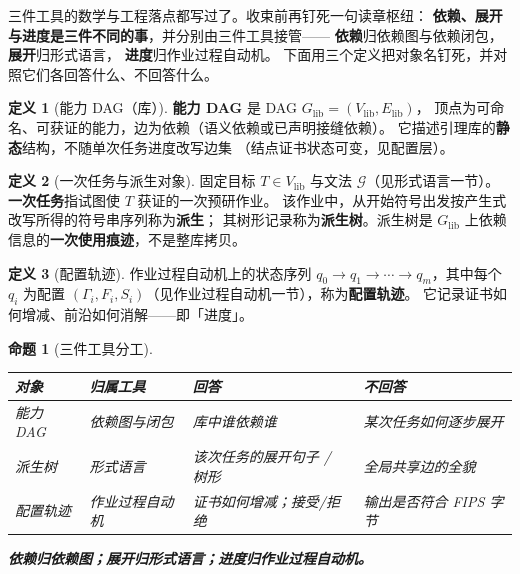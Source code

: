 \documentclass[UTF8,a4paper,11pt]{ctexart}
\theoremstyle{definition}
\newtheorem{definition}{定义}[section]
\theoremstyle{plain}
\newtheorem{proposition}{命题}[section]
\theoremstyle{remark}
\numberwithin{figure}{section}
\numberwithin{table}{section}
\begin{document}
三件工具的数学与工程落点都写过了。收束前再钉死一句读章枢纽：
\textbf{依赖、展开与进度是三件不同的事}，并分别由三件工具接管——
\textbf{依赖}归依赖图与依赖闭包，
\textbf{展开}归形式语言，
\textbf{进度}归作业过程自动机。
下面用三个定义把对象名钉死，并对照它们各回答什么、不回答什么。

\begin{definition}[能力 DAG（库）]
\textbf{能力 DAG} 是 DAG $G_{\mathrm{lib}}=(V_{\mathrm{lib}},E_{\mathrm{lib}})$，
顶点为可命名、可获证的能力，边为依赖（语义依赖或已声明接缝依赖）。
它描述引理库的\textbf{静态}结构，不随单次任务进度改写边集
（结点证书状态可变，见配置层）。
\end{definition}

\begin{definition}[一次任务与派生对象]
固定目标 $T\in V_{\mathrm{lib}}$ 与文法 $\mathcal{G}$（见形式语言一节）。
\textbf{一次任务}指试图使 $T$ 获证的一次预研作业。
该作业中，从开始符号出发按产生式改写所得的符号串序列称为\textbf{派生}；
其树形记录称为\textbf{派生树}。派生树是 $G_{\mathrm{lib}}$ 上依赖信息的\textbf{一次使用痕迹}，不是整库拷贝。
\end{definition}

\begin{definition}[配置轨迹]
作业过程自动机上的状态序列 $q_0\to q_1\to\cdots\to q_m$，其中每个 $q_i$ 为配置
$(\Gamma_i,F_i,S_i)$（见作业过程自动机一节），称为\textbf{配置轨迹}。
它记录证书如何增减、前沿如何消解——即「进度」。
\end{definition}

\begin{proposition}[三件工具分工]
\begin{center}
\begin{tabular}{@{}L{2.8cm}L{2.4cm}L{4.2cm}L{4.0cm}@{}}
  \toprule
  对象 & 归属工具 & 回答 & 不回答 \\
  \midrule
  能力 DAG & 依赖图与闭包 & 库中谁依赖谁 & 某次任务如何逐步展开 \\
  派生树 & 形式语言 & 该次任务的展开句子 / 树形 & 全局共享边的全貌 \\
  配置轨迹 & 作业过程自动机 & 证书如何增减；接受/拒绝 & 输出是否符合 FIPS 字节 \\
  \bottomrule
\end{tabular}
\end{center}
\noindent
\textbf{依赖归依赖图；展开归形式语言；进度归作业过程自动机。}
\end{proposition}
\end{document}
